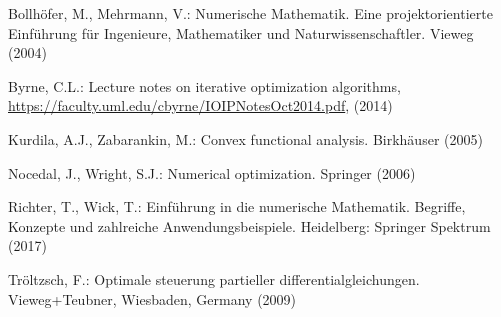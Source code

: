 \documentclass[
]{book}
\newenvironment{cslreferences}%
  {}%
  {\par}
\theoremstyle{definition}
\theoremstyle{definition}
\theoremstyle{definition}
\theoremstyle{definition}
\theoremstyle{remark}
\begin{document}
\hypertarget{refs}{}
\begin{cslreferences}
\leavevmode\hypertarget{ref-BolM04}{}%
Bollhöfer, M., Mehrmann, V.: Numerische Mathematik. Eine projektorientierte Einführung für Ingenieure, Mathematiker und Naturwissenschaftler. Vieweg (2004)

\leavevmode\hypertarget{ref-Byr14}{}%
Byrne, C.L.: Lecture notes on iterative optimization algorithms, \url{https://faculty.uml.edu/cbyrne/IOIPNotesOct2014.pdf}, (2014)

\leavevmode\hypertarget{ref-KurZ05}{}%
Kurdila, A.J., Zabarankin, M.: Convex functional analysis. Birkhäuser (2005)

\leavevmode\hypertarget{ref-NocW06}{}%
Nocedal, J., Wright, S.J.: Numerical optimization. Springer (2006)

\leavevmode\hypertarget{ref-RicW17}{}%
Richter, T., Wick, T.: Einführung in die numerische Mathematik. Begriffe, Konzepte und zahlreiche Anwendungsbeispiele. Heidelberg: Springer Spektrum (2017)

\leavevmode\hypertarget{ref-Tr09}{}%
Tröltzsch, F.: Optimale steuerung partieller differentialgleichungen. Vieweg+Teubner, Wiesbaden, Germany (2009)
\end{cslreferences}
\end{document}

